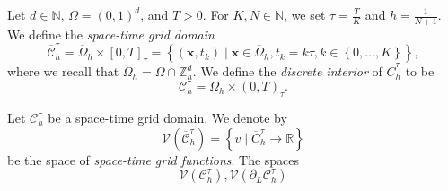 \begin{frame}
    \begin{definition}
        Let $d\in\mathbb{N}$, $\Omega=\left(0,1\right)^{d}$, and $T>0$.
        For $K, N\in\mathbb{N}$, we set $\tau=\frac{T}{K}$ and
        $h=\frac{1}{N+1}$.
        We define the \emph{space-time grid domain}
        \begin{equation*}
            \overline{\mathcal{C}}^{\tau}_{h}=
            \overline{\Omega}_{h}\times
            {\left[0,T\right]}_{\tau}=
            \left\{
            \left(\mathbf{x},t_{k}\right)\mid
            \mathbf{x}\in\overline{\Omega}_{h},
            t_{k}=k\tau,
            k\in\left\{0,\dotsc,K\right\}
            \right\},
        \end{equation*}
        where we recall that
        \begin{math}
            \overline{\Omega}_{h}=
            \overline{\Omega}\cap
            \mathbb{Z}^{d}_{h}
        \end{math}.
        We define the \emph{discrete interior} of $\overline{C}^{\tau}_{h}$ to be
        \begin{equation*}
            \mathcal{C}^{\tau}_{h}=\Omega_{h}\times
            \left(0,T\right)_{\tau}.
        \end{equation*}
    \end{definition}

    \begin{definition}
        Let $\mathcal{C}^{\tau}_{h}$ be a space-time grid domain.
        We denote by
        \begin{equation*}
            \mathcal{V}
            \left(
            \overline{\mathcal{C}}^{\tau}_{h}
            \right)=
            \left\{
            v\mid
            \overline{C}^{\tau}_{h}\to\mathbb{R}
            \right\}
        \end{equation*}
        be the space of \emph{space-time grid functions}.
        The spaces
        \begin{equation*}
            \mathcal{V}
            \left(
            \mathcal{C}^{\tau}_{h}
            \right),
            \mathcal{V}
            \left(
            \partial_{L}\mathcal{C}^{\tau}_{h}
            \right)
        \end{equation*}
    \end{definition}
\end{frame}

